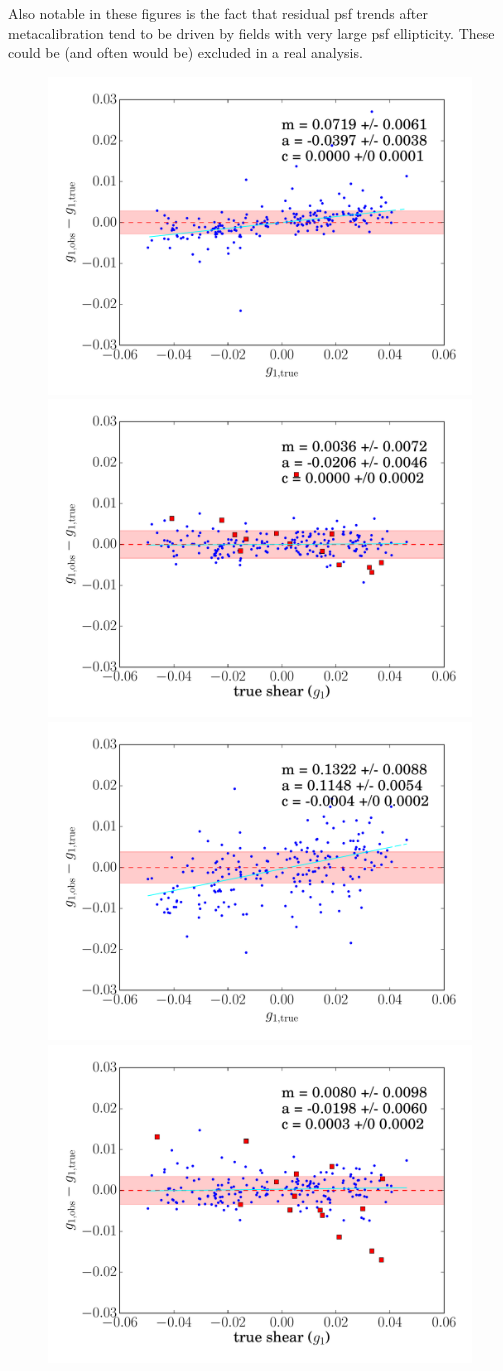\documentclass[iop]{emulateapj}
\begin{document}
Also notable in these figures is the fact that residual psf trends
after metacalibration tend to be driven by fields with very large psf
ellipticity. These could be (and often would be) excluded in a real
analysis. 
\begin{figure}[t]
\begin{center}
\includegraphics[width=0.46\linewidth]{./Plots/m1-no_corrections-regauss.pdf}
\includegraphics[width=0.46\linewidth]{./Plots/m1-regauss-opt-shear_plots.pdf}\\
\includegraphics[width=0.46\linewidth]{./Plots/m1-no_corrections-ksb.pdf}
\includegraphics[width=0.46\linewidth]{./Plots/m1-ksb-opt-shear_plots.pdf}\\

\end{center}
\end{figure}
\end{document}
